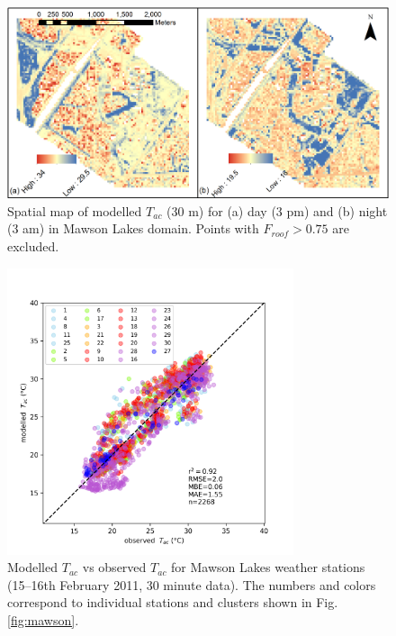 \documentclass[gmd, manuscript]{copernicus}
\begin{document}
\begin{figure}[!htbp]

\begin{center}

\end{center}

\includegraphics[width=1\textwidth,keepaspectratio]{figure6.png}

 \caption{Spatial map of modelled $T_{ac}$ (30 m) for (a) day (3 pm) and (b) night (3 am) in Mawson Lakes domain. Points with $F_{roof} > 0.75$ are excluded. } \label{fig:MawsonModelledTas}
\end{figure}





\begin{figure}[!htbp]
\begin{center}


\includegraphics[width=0.75\textwidth,keepaspectratio]{figure7.png}

 \caption{Modelled $T_{ac}$ vs observed $T_{ac}$ for Mawson Lakes weather stations (15--16th February 2011, 30 minute data). The  numbers and colors correspond to individual stations and clusters shown in Fig. \ref{fig:mawson}. } \label{fig:MawsonModObs}
\end{center}
\end{figure}
\end{document}

